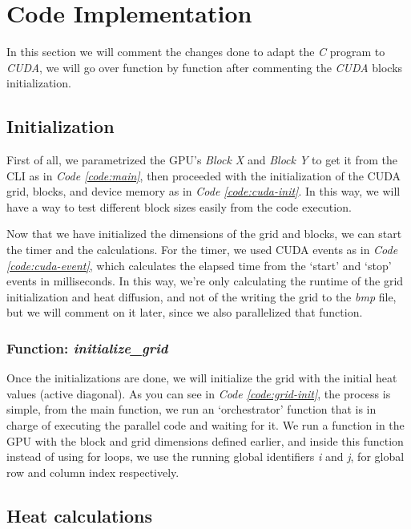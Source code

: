 \documentclass[../main.tex]{subfiles}
\begin{document}
\section{Code Implementation}

In this section we will comment the changes done to adapt the \textit{C} program to \textit{CUDA}, we will go over function by function after commenting the \textit{CUDA} blocks initialization.

\subsection{Initialization}

First of all, we parametrized the GPU's \textit{Block X} and \textit{Block Y} to get it from the CLI as in \textit{Code \ref{code:main}}, then proceeded with the initialization of the CUDA grid, blocks, and device memory as in \textit{Code \ref{code:cuda-init}}. In this way, we will have a way to test different block sizes easily from the code execution.

Now that we have initialized the dimensions of the grid and blocks, we can start the timer and the calculations. For the timer, we used CUDA events as in \textit{Code \ref{code:cuda-event}}, which calculates the elapsed time from the `start' and `stop' events in milliseconds. In this way, we're only calculating the runtime of the grid initialization and heat diffusion, and not of the writing the grid to the \textit{bmp} file, but we will comment on it later, since we also parallelized that function.

\subsubsection{Function: \textit{initialize\_grid}} \label{sec:init-grid}

Once the initializations are done, we will initialize the grid with the initial heat values (active diagonal). As you can see in \textit{Code \ref{code:grid-init}}, the process is simple, from the main function, we run an `orchestrator' function that is in charge of executing the parallel code and waiting for it. We run a function in the GPU with the block and grid dimensions defined earlier, and inside this function instead of using for loops, we use the running global identifiers \textit{i} and \textit{j}, for global row and column index respectively. 

\subsection{Heat calculations}
\end{document}

